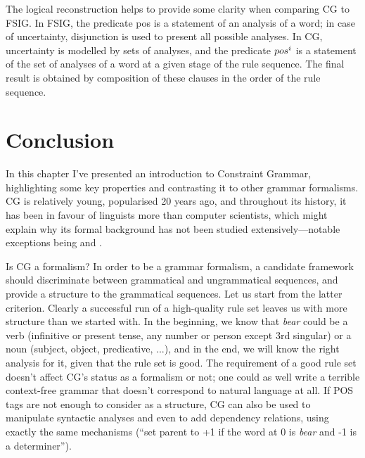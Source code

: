 The logical reconstruction helps to provide some clarity when comparing CG
to FSIG. In FSIG, the predicate {\sc pos} is a statement of an analysis of a
word; in case of uncertainty, disjunction is used to present all possible analyses. In CG, uncertainty is modelled by sets of analyses,
and the predicate ${\sc pos}^i$ is a statement of the
set of analyses of a word at a given stage of the rule sequence. The
final result is obtained by composition of these clauses in the order of
the rule sequence.


\section{Conclusion}

In this chapter I've presented an introduction to Constraint Grammar,
highlighting some key properties and contrasting it to other grammar
formalisms.
CG is relatively young, popularised 20 years ago, and throughout its
history, it has been in favour of linguists more than computer
scientists, which might explain why its formal background has not been
studied extensively---notable exceptions being \cite{lager98} and \cite{lager_nivre01}.
 
Is CG a formalism? In order to be a grammar formalism, a candidate
framework should discriminate between grammatical and ungrammatical
sequences, and provide a structure to the grammatical sequences.
Let us start from the latter criterion. Clearly a successful run of a
high-quality rule set leaves us with more structure than we started
with. In the beginning, we know that \emph{bear} could be a verb
(infinitive or present tense, any number or person except 3rd
singular) or a noun (subject, object, predicative, ...), and in the end, we
will know the right analysis for it, given that the rule set is
good. The requirement of a good rule set doesn't affect CG's status as
a formalism or not; one could as well write a terrible context-free
grammar that doesn't correspond to natural language at all.
If POS tags are not enough to consider as a structure,
CG can also be used to manipulate syntactic analyses and even to add
dependency relations, using exactly the same mechanisms (``set parent to +1 if the word at 0 is \emph{bear} and -1 is a determiner'').

